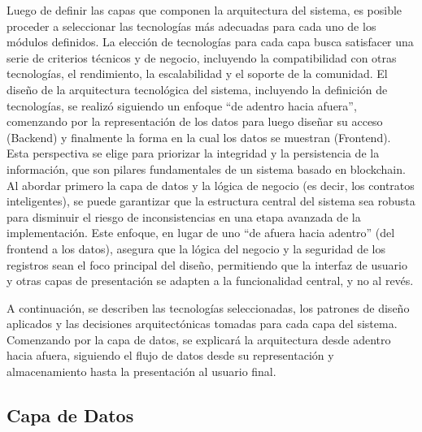 Luego de definir las capas que componen la arquitectura del sistema, es posible proceder a seleccionar las tecnologías más adecuadas para cada uno de los módulos definidos. La elección de tecnologías para cada capa busca satisfacer una serie de criterios técnicos y de negocio, incluyendo la compatibilidad con otras tecnologías, el rendimiento, la escalabilidad y el soporte de la comunidad. El diseño de la arquitectura tecnológica del sistema, incluyendo la definición de tecnologías, se realizó siguiendo un enfoque ``de adentro hacia afuera'', comenzando por la representación de los datos para luego diseñar su acceso (Backend) y finalmente la forma en la cual los datos se muestran (Frontend). Esta perspectiva se elige para priorizar la integridad y la persistencia de la información, que son pilares fundamentales de un sistema basado en blockchain. Al abordar primero la capa de datos y la lógica de negocio (es decir, los contratos inteligentes), se puede garantizar que la estructura central del sistema sea robusta para disminuir el riesgo de inconsistencias en una etapa avanzada de la implementación. Este enfoque, en lugar de uno ``de afuera hacia adentro'' (del frontend a los datos), asegura que la lógica del negocio y la seguridad de los registros sean el foco principal del diseño, permitiendo que la interfaz de usuario y otras capas de presentación se adapten a la funcionalidad central, y no al revés.

A continuación, se describen las tecnologías seleccionadas, los patrones de diseño aplicados y las decisiones arquitectónicas tomadas para cada capa del sistema. Comenzando por la capa de datos, se explicará la arquitectura desde adentro hacia afuera, siguiendo el flujo de datos desde su representación y almacenamiento hasta la presentación al usuario final.

\subsection{Capa de Datos}

